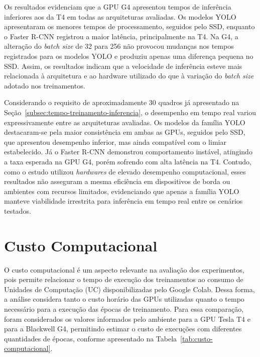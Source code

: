 Os resultados evidenciam que a GPU G4 apresentou tempos de inferência inferiores aos da T4 em todas
as arquiteturas avaliadas. Os modelos YOLO apresentaram os menores tempos de processamento, seguidos
pelo SSD, enquanto o Faster R-CNN registrou a maior latência, principalmente na T4. Na G4, a
alteração do \textit{batch size} de 32 para 256 não provocou mudanças nos tempos registrados para
os modelos YOLO e produziu apenas uma diferença pequena no SSD. Assim, os resultados indicam que a
velocidade de inferência esteve mais relacionada à arquitetura e ao hardware utilizado do que à
variação do \textit{batch size} adotado nos treinamentos.

Considerando o requisito de aproximadamente 30 quadros já apresentado na Seção~\ref{subsec:tempo-treinamento-inferencia}, 
o desempenho em tempo real variou expressivamente entre as arquiteturas avaliadas. 
Os modelos da família YOLO destacaram-se pela maior consistência em ambas as GPUs,
seguidos pelo SSD, que apresentou desempenho inferior, mas ainda compatível com o limiar
estabelecido. Já o Faster R-CNN demonstrou comportamento instável, atingindo a taxa esperada na
GPU G4, porém sofrendo com alta latência na T4. Contudo, como o estudo utilizou \textit{hardwares} de elevado
desempenho computacional, esses resultados não asseguram a mesma eficiência em dispositivos de
borda ou ambientes com recursos limitados, evidenciando que apenas a família YOLO manteve
viabilidade irrestrita para inferência em tempo real entre os cenários testados.

\section{Custo Computacional}
\label{sec:custo-computacional}

O custo computacional é um aspecto relevante na avaliação dos experimentos, pois permite
relacionar o tempo de execução dos treinamentos ao consumo de Unidades de Computação (UC)
disponibilizadas pelo Google Colab. Dessa forma, a análise considera tanto o custo horário
das GPUs utilizadas quanto o tempo necessário para a execução das épocas de treinamento.
Para essa comparação, foram considerados os valores informados pelo ambiente para a GPU
Tesla T4 e para a Blackwell G4, permitindo estimar o custo de execuções com diferentes
quantidades de épocas, conforme apresentado na Tabela~\ref{tab:custo-computacional}.

